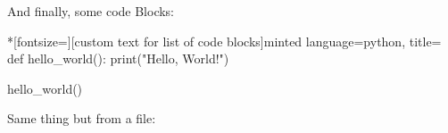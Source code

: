 \documentclass[../paper.tex]{subfiles}
\begin{document}
    And finally, some code Blocks:

    \begin{codeBlock}*[fontsize=\scriptsize][custom text for list of code blocks]{minted language=python, title=}
        def hello_world():
            print("Hello, World!")

        hello_world()
    \end{codeBlock}

    Same thing but from a file:


    \ifSubfilesClassLoaded{%
        \printbibliography{}%
    }{}
\end{document}
